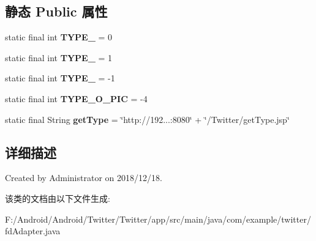 \subsection*{静态 Public 属性}
\begin{DoxyCompactItemize}
\item 
\mbox{\label{classcom_1_1example_1_1twitter_1_1fd_adapter_a4fd405215313cfc0418b782ef828c69b}} 
static final int {\bfseries T\+Y\+P\+E\+\_} = 0
\item 
\mbox{\label{classcom_1_1example_1_1twitter_1_1fd_adapter_a046618ff308de0677e2682db4015dee2}} 
static final int {\bfseries T\+Y\+P\+E\+\_} = 1
\item 
\mbox{\label{classcom_1_1example_1_1twitter_1_1fd_adapter_a3c0b537f7eed4be2cfea0fd857640725}} 
static final int {\bfseries T\+Y\+P\+E\+\_} = -\/1
\item 
\mbox{\label{classcom_1_1example_1_1twitter_1_1fd_adapter_a6e17511d9e9cafdde7be08e1b9d7cd0d}} 
static final int {\bfseries T\+Y\+P\+E\+\_\+\+O\+\_\+\+P\+IC} = -\/4
\item 
\mbox{\label{classcom_1_1example_1_1twitter_1_1fd_adapter_a13937ae98ad738004af886a088240b7f}} 
static final String {\bfseries get\+Type} = \char`\"{}http\+://192...\+:8080\char`\"{} + \char`\"{}/Twitter/get\+Type.\+jsp\char`\"{}
\end{DoxyCompactItemize}


\subsection{详细描述}
Created by Administrator on 2018/12/18. 

该类的文档由以下文件生成\+:\begin{DoxyCompactItemize}
\item 
F\+:/\+Android/\+Android/\+Twitter/\+Twitter/app/src/main/java/com/example/twitter/fd\+Adapter.\+java\end{DoxyCompactItemize}
